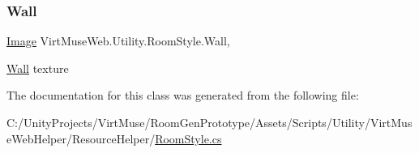 \subsubsection{\texorpdfstring{Wall}{Wall}}
{\footnotesize\ttfamily \mbox{\hyperlink{class_virt_muse_web_1_1_utility_1_1_image}{Image}} Virt\+Muse\+Web.\+Utility.\+Room\+Style.\+Wall\hspace{0.3cm}{\ttfamily [get]}, {\ttfamily [set]}}



\mbox{\hyperlink{class_wall}{Wall}} texture 



The documentation for this class was generated from the following file\+:\begin{DoxyCompactItemize}
\item 
C\+:/\+Unity\+Projects/\+Virt\+Muse/\+Room\+Gen\+Prototype/\+Assets/\+Scripts/\+Utility/\+Virt\+Muse\+Web\+Helper/\+Resource\+Helper/\mbox{\hyperlink{_virt_muse_web_helper_2_resource_helper_2_room_style_8cs}{Room\+Style.\+cs}}\end{DoxyCompactItemize}
